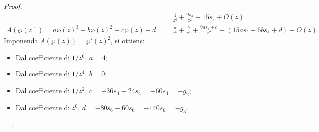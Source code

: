 \begin{proof}
\begin{eqnarray*}
          & = & \frac{1}{z^6} + \frac{9s_4}{z^2} + 15s_6 + O(z) \\
A(\wp(z)) = a\wp(z)^3+b\wp(z)^2 + c\wp(z)+d & = & \frac{a}{z^6} + \frac{b}{z^4} + \frac{9as_4+c}{z^2} + (15as_6+6bs_4+d) + O(z) 
\end{eqnarray*}
Imponendo $A(\wp(z))=\wp'(z)^2$, si ottiene:
\begin{itemize}
\item Dal coefficiente di $1/z^6$, $a=4$;
\item Dal coefficiente di $1/z^4$, $b=0$;
\item Dal coefficiente di $1/z^2$, $c = -36s_4-24s_4 = -60s_4 = -g_2$;
\item Dal coefficiente di $z^0$, $d=-80s_6-60s_6 = -140s_6 = -g_3$.
\end{itemize}
\end{proof}

